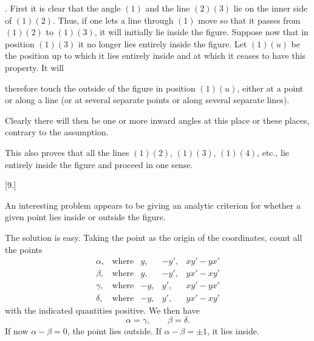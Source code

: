 \par{}%
. First it is clear that the angle $(1)$ and the line $(2)(3)$ lie on the inner side of $(1)(2)$. Thus, if one lets a line through $(1)$ move so that it passes from $(1)(2)$ to $(1)(3)$, it will initially lie inside the figure. Suppose now that in position $(1)(3)$ it no longer lies entirely inside the figure. Let $(1)(u)$ be the position up to which it lies entirely inside and at which it ceases to have this property. It will

\begin{center}\hfill\end{center}
\noindent therefore touch the outside of the figure in position $(1)(u)$, either at a point or along a line (or at several separate points or along several separate lines).

Clearly there will then be one or more inward angles at this place or these places, contrary to the assumption.

This also proves that all the lines $(1)(2)$, $(1)(3)$, $(1)(4)$, etc., lie entirely inside the figure and proceed in one sense.

\begin{center}
[9.]
\end{center}

An interesting problem appears to be giving an analytic criterion for whether a given point lies inside or outside the figure.

The solution is easy. Taking the point as the origin of the coordinates, count all the points
\[
\begin{array}{cllll}
\alpha, & \text{where} & y, & -y', & xy'-yx' \\
\beta, & \text{where} & y, & -y', & yx'-xy' \\
\gamma, & \text{where} & -y, & y', & xy'-yx' \\
\delta, & \text{where} & -y, & y', & yx'-xy'
\end{array}
\]
with the indicated quantities positive. We then have
\[
\alpha = \gamma, \qquad \beta = \delta.
\]
If now $\alpha - \beta = 0$, the point lies outside. If $\alpha - \beta = \pm 1$, it lies inside.
